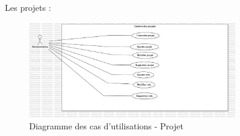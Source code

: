 \documentclass{article}
\begin{document}
                \FloatBarrier
                
                Les projets :
                \begin{figure}[h!]
                    \centering
                    \includegraphics[width=0.8\textwidth]{assets/diagrammes/jpg/Model6!UseCaseProject_5.jpg}
                    \caption{Diagramme des cas d'utilisations - Projet}
                \end{figure}
                \FloatBarrier
            
\end{document}
